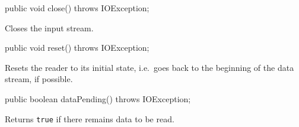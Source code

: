 \begin{code}

   public void close() throws IOException;
\end{code}
\begin{tabb}
Closes the input stream.
\end{tabb}
\begin{code}

   public void reset() throws IOException;
\end{code}
\begin{tabb}
Resets the reader to its initial state, i.e.\ goes back to the beginning of the data stream, if possible.
\end{tabb}
\begin{code}
   
   public boolean dataPending() throws IOException;
\end{code}
\begin{tabb}
Returns \texttt{true} if there remains data to be read.
\end{tabb}


\begin{code}\begin{hide}
}
\end{hide}\end{code}
